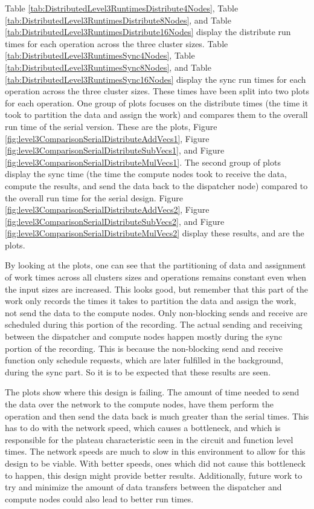 Table \ref{tab:DistributedLevel3RuntimesDistribute4Nodes}, Table \ref{tab:DistributedLevel3RuntimesDistribute8Nodes}, and Table \ref{tab:DistributedLevel3RuntimesDistribute16Nodes} display the distribute run times for each operation across the three cluster sizes. Table \ref{tab:DistributedLevel3RuntimesSync4Nodes}, Table \ref{tab:DistributedLevel3RuntimesSync8Nodes}, and Table \ref{tab:DistributedLevel3RuntimesSync16Nodes} display the sync run times for each operation across the three cluster sizes. These times have been split into two plots for each operation. One group of plots focuses on the distribute times (the time it took to partition the data and assign the work) and compares them to the overall run time of the serial version. These are the  plots, Figure \ref{fig:level3ComparisonSerialDistributeAddVecs1}, Figure \ref{fig:level3ComparisonSerialDistributeSubVecs1}, and Figure \ref{fig:level3ComparisonSerialDistributeMulVecs1}. The second group of plots display the sync time (the time the compute nodes took to receive the data, compute the results, and send the data back to the dispatcher node) compared to the overall run time for the serial design. Figure \ref{fig:level3ComparisonSerialDistributeAddVecs2}, Figure \ref{fig:level3ComparisonSerialDistributeSubVecs2}, and Figure \ref{fig:level3ComparisonSerialDistributeMulVecs2} display these results, and are the  plots.

By looking at the  plots, one can see that the partitioning of data and assignment of work times across all clusters sizes and operations remains constant even when the input sizes are increased. This looks good, but remember that this part of the work only records the times it takes to partition the data and assign the work, not send the data to the compute nodes. Only non-blocking sends and receive are scheduled during this portion of the recording. The actual sending and receiving between the dispatcher and compute nodes happen mostly during the sync portion of the recording. This is because the non-blocking send and receive function only schedule requests, which are later fulfilled in the background, during the sync part. So it is to be expected that these results are seen.

The  plots show where this design is failing. The amount of time needed to send the data over the network to the compute nodes, have them perform the operation and then send the data back is much greater than the serial times. This has to do with the network speed, which causes a bottleneck, and which is responsible for the plateau characteristic seen in the circuit and function level times. The network speeds are much to slow in this environment to allow for this design to be viable. With better speeds, ones which did not cause this bottleneck to happen, this design might provide better results. Additionally, future work to try and minimize the amount of data transfers between the dispatcher and compute nodes could also lead to better run times.

